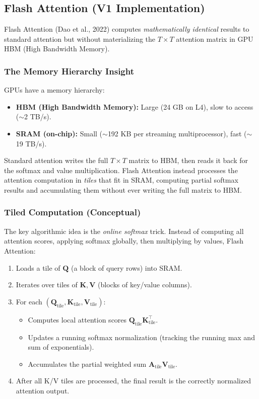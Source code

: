 \documentclass[11pt, a4paper]{article}
\theoremstyle{definition}
\newcommand{\mQ}{\bm{Q}}
\newcommand{\mK}{\bm{K}}
\newcommand{\mV}{\bm{V}}
\newcommand{\mA}{\bm{A}}
\begin{document}
\subsection{Flash Attention (V1 Implementation)}

Flash Attention (Dao et al., 2022) computes \emph{mathematically identical} results to standard attention but without materializing the $T \times T$ attention matrix in GPU HBM (High Bandwidth Memory).

\subsubsection{The Memory Hierarchy Insight}

GPUs have a memory hierarchy:
\begin{itemize}[nosep]
    \item \textbf{HBM (High Bandwidth Memory):} Large (24 GB on L4), slow to access ($\sim$2 TB/s).
    \item \textbf{SRAM (on-chip):} Small ($\sim$192 KB per streaming multiprocessor), fast ($\sim$19 TB/s).
\end{itemize}

Standard attention writes the full $T \times T$ matrix to HBM, then reads it back for the softmax and value multiplication. Flash Attention instead processes the attention computation in \emph{tiles} that fit in SRAM, computing partial softmax results and accumulating them without ever writing the full matrix to HBM.

\subsubsection{Tiled Computation (Conceptual)}

The key algorithmic idea is the \emph{online softmax} trick. Instead of computing all attention scores, applying softmax globally, then multiplying by values, Flash Attention:

\begin{enumerate}
    \item Loads a tile of $\mQ$ (a block of query rows) into SRAM.
    \item Iterates over tiles of $\mK, \mV$ (blocks of key/value columns).
    \item For each $(\mQ_{\text{tile}}, \mK_{\text{tile}}, \mV_{\text{tile}})$:
    \begin{itemize}
        \item Computes local attention scores $\mQ_{\text{tile}} \mK_{\text{tile}}^\top$.
        \item Updates a running softmax normalization (tracking the running max and sum of exponentials).
        \item Accumulates the partial weighted sum $\mA_{\text{tile}} \mV_{\text{tile}}$.
    \end{itemize}
    \item After all K/V tiles are processed, the final result is the correctly normalized attention output.
\end{enumerate}
\end{document}
